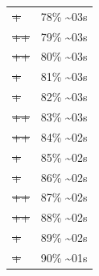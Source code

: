 \documentclass[12pt]{article}
\begin{document}
\begin{center}
\begin{tabular}{ll}
\sout{\sout{\sout{\sout{\sout{\sout{\sout{\sout{\sout{\sout{\sout{\sout{\sout{\sout{\sout{\sout{\sout{\sout{\sout{+}}}}}}}}}}}}}}}}}}} & 78\% \textasciitilde{}03s\\
\sout{\sout{\sout{\sout{\sout{\sout{\sout{\sout{\sout{\sout{\sout{\sout{\sout{\sout{\sout{\sout{\sout{\sout{\sout{++}}}}}}}}}}}}}}}}}}} & 79\% \textasciitilde{}03s\\
\sout{\sout{\sout{\sout{\sout{\sout{\sout{\sout{\sout{\sout{\sout{\sout{\sout{\sout{\sout{\sout{\sout{\sout{\sout{++}}}}}}}}}}}}}}}}}}} & 80\% \textasciitilde{}03s\\
\sout{\sout{\sout{\sout{\sout{\sout{\sout{\sout{\sout{\sout{\sout{\sout{\sout{\sout{\sout{\sout{\sout{\sout{\sout{\sout{+}}}}}}}}}}}}}}}}}}}} & 81\% \textasciitilde{}03s\\
\sout{\sout{\sout{\sout{\sout{\sout{\sout{\sout{\sout{\sout{\sout{\sout{\sout{\sout{\sout{\sout{\sout{\sout{\sout{\sout{+}}}}}}}}}}}}}}}}}}}} & 82\% \textasciitilde{}03s\\
\sout{\sout{\sout{\sout{\sout{\sout{\sout{\sout{\sout{\sout{\sout{\sout{\sout{\sout{\sout{\sout{\sout{\sout{\sout{\sout{++}}}}}}}}}}}}}}}}}}}} & 83\% \textasciitilde{}03s\\
\sout{\sout{\sout{\sout{\sout{\sout{\sout{\sout{\sout{\sout{\sout{\sout{\sout{\sout{\sout{\sout{\sout{\sout{\sout{\sout{++}}}}}}}}}}}}}}}}}}}} & 84\% \textasciitilde{}02s\\
\sout{\sout{\sout{\sout{\sout{\sout{\sout{\sout{\sout{\sout{\sout{\sout{\sout{\sout{\sout{\sout{\sout{\sout{\sout{\sout{\sout{+}}}}}}}}}}}}}}}}}}}}} & 85\% \textasciitilde{}02s\\
\sout{\sout{\sout{\sout{\sout{\sout{\sout{\sout{\sout{\sout{\sout{\sout{\sout{\sout{\sout{\sout{\sout{\sout{\sout{\sout{\sout{+}}}}}}}}}}}}}}}}}}}}} & 86\% \textasciitilde{}02s\\
\sout{\sout{\sout{\sout{\sout{\sout{\sout{\sout{\sout{\sout{\sout{\sout{\sout{\sout{\sout{\sout{\sout{\sout{\sout{\sout{\sout{++}}}}}}}}}}}}}}}}}}}}} & 87\% \textasciitilde{}02s\\
\sout{\sout{\sout{\sout{\sout{\sout{\sout{\sout{\sout{\sout{\sout{\sout{\sout{\sout{\sout{\sout{\sout{\sout{\sout{\sout{\sout{++}}}}}}}}}}}}}}}}}}}}} & 88\% \textasciitilde{}02s\\
\sout{\sout{\sout{\sout{\sout{\sout{\sout{\sout{\sout{\sout{\sout{\sout{\sout{\sout{\sout{\sout{\sout{\sout{\sout{\sout{\sout{\sout{+}}}}}}}}}}}}}}}}}}}}}} & 89\% \textasciitilde{}02s\\
\sout{\sout{\sout{\sout{\sout{\sout{\sout{\sout{\sout{\sout{\sout{\sout{\sout{\sout{\sout{\sout{\sout{\sout{\sout{\sout{\sout{\sout{+}}}}}}}}}}}}}}}}}}}}}} & 90\% \textasciitilde{}01s\\

\end{tabular}
\end{center}
\end{document}
